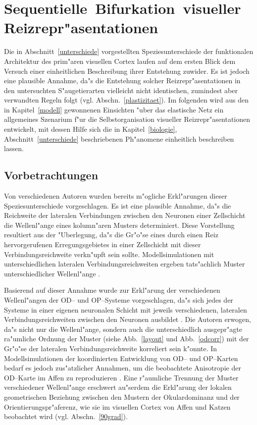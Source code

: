 \section{\mbox{Sequentielle}~\mbox{Bifurkation}~\mbox{visueller}~\mbox{Reizrepr"asentationen}}
\label{main}
\thispagestyle{plain}

Die in Abschnitt~\ref{unterschiede} vorgestellten Speziesunterschiede der
funktionalen Architektur des prim"aren visuellen Cortex laufen auf dem
ersten Blick dem Versuch einer einheitlichen Beschreibung ihrer Entstehung
zuwider.  Es ist jedoch eine plausible Annahme, da"s die Entstehung solcher
Reizrepr"asentationen in den untersuchten S"augetierarten vielleicht nicht
identischen, zumindest aber verwandten Regeln folgt
(vgl. Abschn.~\ref{plastizitaet}).  Im folgenden wird aus den in
Kapitel~\ref{modell} gewonnenen Einsichten "uber das elastische Netz ein
allgemeines Szenarium f"ur die Selbstorganisation visueller
Reizrepr"asentationen entwickelt, mit dessen Hilfe sich die in
Kapitel~\ref{biologie}, Abschnitt~\ref{unterschiede} beschriebenen
Ph"anomene einheitlich beschreiben lassen.

\subsection{Vorbetrachtungen}

Von verschiedenen Autoren wurden bereits m"ogliche Erkl"arungen dieser
Speziesunterschiede vorgeschlagen.  Es ist eine plausible Annahme, da"s die
Reichweite der lateralen Verbindungen zwischen den Neuronen einer
Zellschicht die Wellenl"ange eines kolumn"aren Musters determiniert. Diese
Vorstellung resultiert aus der "Uberlegung, da"s die Gr"o"se eines durch
einen Reiz hervorgerufenen Erregungsgebietes in einer Zellschicht mit
dieser Verbindungsreichweite verkn"upft sein sollte.  Modellsimulationen
mit unterschiedlichen lateralen Verbindungsreichweiten ergeben tats"achlich
Muster unterschiedlicher Wellenl"ange \cite{swindale:1992}.

Basierend auf dieser Annahme wurde zur Erkl"arung der verschiedenen
Wellenl"angen der OD-- und OP--Systeme vorgeschlagen, da"s sich jedes der
Systeme in einer eigenen neuronalen Schicht mit jeweils verschiedenen,
lateralen Verbindungsreichweiten zwischen den Neuronen ausbildet
\cite{loewel:1988}.  Die Autoren erwogen, da"s nicht nur die Wellenl"ange,
sondern auch die unterschiedlich ausgepr"agte ra"umliche Ordnung der Muster
(siehe Abb.~\ref{layout} und Abb.~\ref{odcorr}) mit der Gr"o"se der
lateralen Verbindungsreichweite korreliert sein k"onnte. In
Modellsimulationen der koordinierten Entwicklung von OD-- und OP--Karten
bedarf es jedoch zus"atzlicher Annahmen, um die beobachtete Anisotropie der
OD--Karte im Affen zu reproduzieren \cite{swindale:1992}.  Eine r"aumliche
Trennung der Muster verschiedener Wellenl"ange erschwert au"serdem die
Erkl"arung der lokalen geometrischen Beziehung zwischen den Mustern der
Okulardominanz und der Orientierungspr"aferenz, wie sie im visuellen Cortex
von Affen und Katzen beobachtet wird (vgl. Abschn.~\ref{90grad}).

